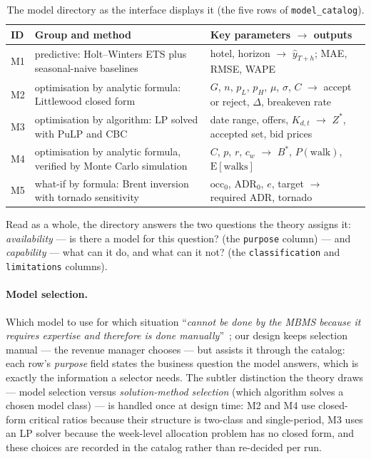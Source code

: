 \begin{table}[H]
\centering
\caption{The model directory as the interface displays it (the five rows of \texttt{model\_catalog}).}
\label{tab:catalogdisplay}
\begin{tabularx}{\textwidth}{@{}l X X@{}}
\toprule
\textbf{ID} & \textbf{Group and method} & \textbf{Key parameters $\to$ outputs} \\
\midrule
M1 & predictive: Holt--Winters ETS plus seasonal-naive baselines & hotel, horizon $\to$ $\hat{y}_{T+h}$; MAE, RMSE, WAPE \\
M2 & optimisation by analytic formula: Littlewood closed form & $G$, $n$, $p_L$, $p_H$, $\mu$, $\sigma$, $C$ $\to$ accept or reject, $\Delta$, breakeven rate \\
M3 & optimisation by algorithm: LP solved with PuLP and CBC & date range, offers, $K_{d,t}$ $\to$ $Z^{*}$, accepted set, bid prices \\
M4 & optimisation by analytic formula, verified by Monte Carlo simulation & $C$, $p$, $r$, $c_w$ $\to$ $B^{*}$, $P(\text{walk})$, $\mathrm{E}[\text{walks}]$ \\
M5 & what-if by formula: Brent inversion with tornado sensitivity & $\mathrm{occ}_0$, $\mathrm{ADR}_0$, $e$, target $\to$ required ADR, tornado \\
\bottomrule
\end{tabularx}
\end{table}

Read as a whole, the directory answers the two questions the theory assigns it: \emph{availability} --- is there a model for this question? (the \texttt{purpose} column) --- and \emph{capability} --- what can it do, and what can it not? (the \texttt{classification} and \texttt{limitations} columns).

\paragraph{Model selection.}
Which model to use for which situation ``\emph{cannot be done by the MBMS because it requires expertise and therefore is done manually}''~\cite{turban2011}; our design keeps selection manual --- the revenue manager chooses --- but assists it through the catalog: each row's \emph{purpose} field states the business question the model answers, which is exactly the information a selector needs. The subtler distinction the theory draws --- model selection versus \emph{solution-method selection} (which algorithm solves a chosen model class) --- is handled once at design time: M2 and M4 use closed-form critical ratios because their structure is two-class and single-period, M3 uses an LP solver because the week-level allocation problem has no closed form, and these choices are recorded in the catalog rather than re-decided per run.

